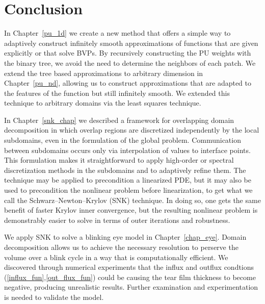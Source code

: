 \chapter{Conclusion}

In Chapter~\ref{pu_1d} we create a new method that offers a simple way to adaptively construct infinitely smooth approximations of functions that are given explicitly or that solve BVPs. By recursively constructing the PU weights with the binary tree, we avoid the need to determine the neighbors of each patch. We extend the tree based approximations to arbitrary dimension in Chapter~\ref{pu_nd}, allowing us to construct approximations that are adapted to the features of the function but still infinitely smooth. We extended this technique to arbitrary domains via the least squares technique. 

In Chapter~\ref{snk_chap} we described a framework for overlapping domain decomposition in which overlap regions are discretized independently by the local subdomains, even in the formulation of the global problem. Communication between subdomains occurs only via interpolation of values to interface points. This formulation makes it straightforward to apply high-order or spectral discretization methods in the subdomains and to adaptively refine them. The technique may be applied to precondition a linearized PDE, but it may also be used to precondition the nonlinear problem before linearization, to get what we call the Schwarz--Newton--Krylov (SNK) technique. In doing so, one gets the same benefit of faster Krylov inner convergence, but the resulting nonlinear problem is demonstrably easier to solve in terms of outer iterations and robustness. 

We apply SNK to solve a blinking eye model in Chapter~\ref{chap_eye}. Domain decomposition allows us to achieve the necessary resolution to perserve the volume over a blink cycle in a way that is computationally efficient. We discovered through numerical experiments that the influx and outflux condtions (\ref{influx_fun},\ref{out_flux_fun}) could be causing the tear film thickness to become negative, producing unrealistic results. Further examination and experimentation is needed to validate the model.

